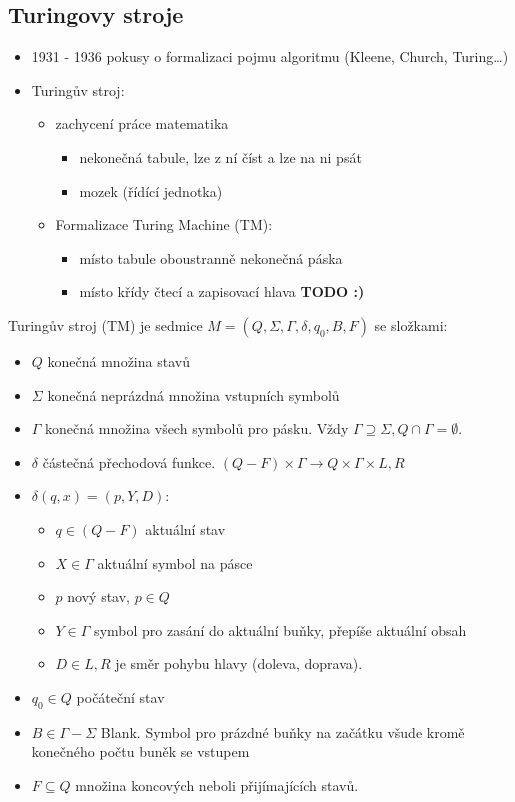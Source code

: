 \documentclass[../main.tex]{subfiles}
\begin{document}
\subsection{Turingovy stroje}
\begin{itemize}
    \item 1931 - 1936 pokusy o formalizaci pojmu algoritmu (Kleene, Church, Turing\dots)
    \item Turingův stroj:
    \begin{itemize}
        \item zachycení práce matematika
        \begin{itemize}
            \item nekonečná tabule, lze z ní číst a lze na ni psát
            \item mozek (řídící jednotka)
        \end{itemize}
        \item Formalizace Turing Machine (TM):
        \begin{itemize}
            \item místo tabule oboustranně nekonečná páska
            \item místo křídy čtecí a zapisovací hlava \textbf{TODO :)}
        \end{itemize}
    \end{itemize}
\end{itemize}
\begin{definition}
    Turingův stroj (TM) je sedmice $M = (Q,\Sigma,\Gamma,\delta,q_0,B,F)$ se složkami:
    \begin{itemize}
        \item $Q$ konečná množina stavů
        \item $\Sigma$ konečná neprázdná množina vstupních symbolů
        \item $\Gamma$ konečná množina všech symbolů pro pásku. Vždy $\Gamma \supseteq \Sigma, Q\cap \Gamma = \emptyset$.
        \item $\delta$ částečná přechodová funkce. $(Q - F) \times \Gamma \rightarrow Q\times \Gamma \times {L,R}$
        \item $\delta(q,x) = (p,Y,D)$:
        \begin{itemize}
            \item $q \in (Q-F)$ aktuální stav
            \item $X \in \Gamma$ aktuální symbol na pásce
            \item $p$ nový stav, $p \in Q$
            \item $Y \in \Gamma$ symbol pro zasání do aktuální buňky, přepíše aktuální obsah
            \item $D \in {L,R}$ je směr pohybu hlavy (doleva, doprava).
        \end{itemize}
        \item $q_0 \in Q$ počáteční stav
        \item $B\in \Gamma - \Sigma$ Blank. Symbol pro prázdné buňky na začátku všude kromě konečného počtu buněk se vstupem
        \item $F \subseteq Q$ množina koncových neboli přijímajících stavů.
    \end{itemize}
\end{definition}
\end{document}
